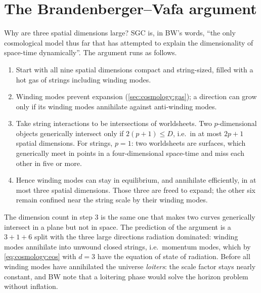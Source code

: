 \section{The Brandenberger--Vafa argument}\label{sec:cosmology:bv}

Why are three spatial dimensions large? SGC is, in BW's words, ``the only cosmological model
thus far that has attempted to explain the dimensionality of space-time dynamically''.
 The argument runs as
follows. 
\begin{enumerate}[leftmargin=*,itemsep=1pt]
\item Start with all nine spatial dimensions compact and string-sized, filled with a hot gas
 of strings including winding modes.
\item Winding modes prevent expansion (\cref{sec:cosmology:gas}); a direction can grow only
 if its winding modes annihilate against anti-winding modes.
\item Take string interactions to be intersections of worldsheets. Two $p$-dimensional
 objects generically intersect only if $2(p+1)\le D$, i.e.\ in at most $2p+1$ spatial
 dimensions. For strings, $p=1$: two worldsheets are surfaces, which generically meet in
 points in a four-dimensional space-time and miss each other in five or more.
\item Hence winding modes can stay in equilibrium, and annihilate efficiently, in at most
 three spatial dimensions. Those three are freed to expand; the other six remain confined
 near the string scale by their winding modes.
\end{enumerate}
The dimension count in step 3 is the same one that makes two curves generically intersect
in a plane but not in space. The prediction of the argument is a $3+1+6$ split with the
three large directions radiation dominated: winding modes annihilate into unwound closed
strings, i.e.\ momentum modes, which by \eqref{eq:cosmology:eos} with $d=3$ have the
equation of state of radiation.  Before all winding modes
have annihilated the universe \emph{loiters}: the scale factor stays nearly
constant, and BW note that a loitering phase would solve the horizon problem without
inflation. 

